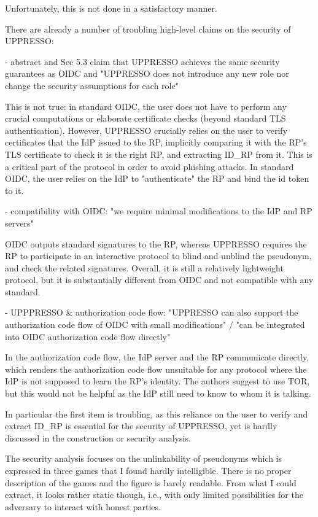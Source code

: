 \documentclass[letterpaper,onecolumn,10pt]{article}
\begin{document}
Unfortunately, this is not done in a satisfactory manner.

There are already a number of troubling high-level claims on the security of UPPRESSO:

- abstract and Sec 5.3 claim that UPPRESSO achieves the same security guarantees as OIDC and "UPPRESSO does not introduce any new role nor change the security assumptions for each role"

This is not true: in standard OIDC, the user does not have to perform any crucial computations or elaborate certificate checks (beyond standard TLS authentication). However, UPPRESSO crucially relies on the user to verify certificates that the IdP issued to the RP, implicitly comparing it with the RP's TLS certificate to check it is the right RP, and extracting ID_RP from it. This is a critical part of the protocol in order to avoid phishing attacks. In standard OIDC, the user relies on the IdP to "authenticate" the RP and bind the id token to it.

- compatibility with OIDC: "we require minimal modifications to the IdP and RP servers"

OIDC outputs standard signatures to the RP, whereas UPPRESSO requires the RP to participate in an interactive protocol to blind and unblind the pseudonym, and check the related signatures. Overall, it is still a relatively lightweight protocol, but it is substantially different from OIDC and not compatible with any standard.

- UPPPRESSO & authorization code flow: "UPPRESSO can also support the authorization code flow of
OIDC with small modifications" / "can be integrated into OIDC authorization code flow directly"

In the authorization code flow, the IdP server and the RP communicate directly, which renders the authorization code flow unsuitable for any protocol where the IdP is not supposed to learn the RP's identity. The authors suggest to use TOR, but this would not be helpful as the IdP still need to know to whom it is talking.


In particular the first item is troubling, as this reliance on the user to verify and extract ID_RP is essential for the security of UPPRESSO, yet is hardly discussed in the construction or security analysis.

The security analysis focuses on the unlinkability of pseudonyms which is expressed in three games that I found hardly intelligible. There is no proper description of the games and the figure is barely readable. From what I could extract, it looks rather static though, i.e., with only limited possibilities for the adversary to interact with honest parties.
\end{document}
